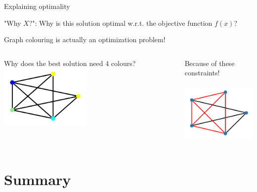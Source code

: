 \documentclass{cons-beamer}
\begin{document}
\begin{frame}{Explaining optimality}
    
  "Why $X$?": Why is this solution optimal w.r.t. the objective function $f(x)$?
  \vfill

  Graph colouring is actually an optimization problem!

  \begin{example}
    \footnotesize   
  \end{example}

  \begin{columns}
    \begin{column}{0.6\textwidth}
      \vspace{-0.5cm}
      \begin{center}
        Why does the best solution need 4 colours?
        \includegraphics[height=30mm]{images/texpl_img/graph_coloured.png}
      \end{center}
    \end{column}

    \begin{column}{0.5\textwidth}
      Because of these constraints!
      \vspace{-0.3cm}
      \begin{center}
        \includegraphics[height=30mm]{images/texpl_img/graph_mus_red.png}
      \end{center}
    \end{column}
  \end{columns}
\end{frame}


\section{Summary}
\end{document}

